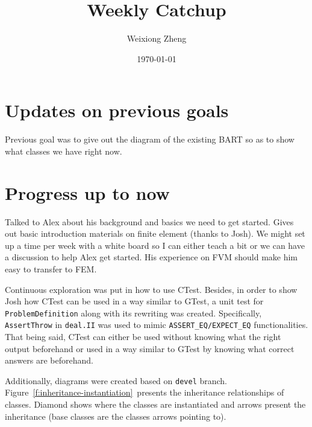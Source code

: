 \documentclass{article}
\title{Weekly Catchup} %
\author{Weixiong Zheng} %
\date{\today} %
\begin{document}
\maketitle %

\section{Updates on previous goals}
Previous goal was to give out the diagram of the existing BART so as to show what classes
we have right now.
\section{Progress up to now}
Talked to Alex about his background and basics we need to get started. Gives out basic introduction materials on finite element (thanks to Josh). We might set up a time per week with a white board so I 
can either teach a bit or we can have a discussion to help Alex get started. His experience on FVM should make 
him easy to transfer to FEM.

Continuous exploration was put in how to use CTest. Besides, in order to show Josh how CTest can be used in a way similar to GTest, a unit test for {\tt ProblemDefinition} along with its rewriting was created. Specifically, {\tt AssertThrow} in {\tt deal.II} was used to mimic {\tt ASSERT\_EQ/EXPECT\_EQ} functionalities. That being said, CTest can either be used without knowing what the right output beforehand or used in a way similar to GTest by knowing what correct answers are beforehand.

Additionally, diagrams were created based on {\tt devel} branch. Figure\ \ref{f:inheritance-instantiation}\ presents the inheritance relationships of classes. Diamond shows where the classes are instantiated and arrows present the inheritance (base classes are the classes arrows pointing to).
\end{document}
